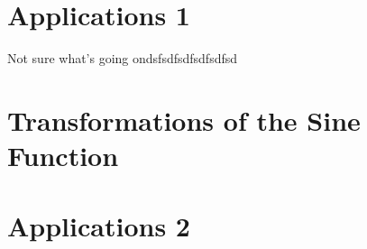 \documentclass{ximera}
\begin{document}
\section{Applications 1}
\begin{question}  \label{Q5dgdgnbhyhy4}

\begin{onlineOnly}
    \begin{center}
\end{center}
\end{onlineOnly}


\end{question}


Not sure what's going ondsfsdfsdfsdfsdfsd

\section{Transformations of the Sine Function}



\section{Applications 2}
\end{document}
